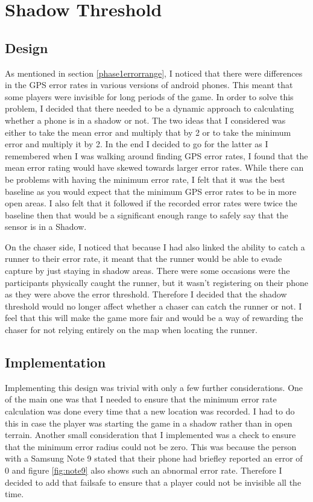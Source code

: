 \documentclass{l4proj}
\begin{document}
\section{Shadow Threshold}

\subsection{Design}
As mentioned in section \ref{phase1errorrange}, I noticed that there were differences in the GPS error rates
in various versions of android phones. This meant that some players were invisible for long periods of the game.
In order to solve this problem, I decided that there needed to be a dynamic approach to calculating whether a
phone is in a shadow or not. The two ideas that I considered was either to take the mean error and multiply that by 2
or to take the minimum error and multiply it by 2. In the end I decided to go for the latter as I remembered when 
I was walking around finding GPS error rates, I found that the mean error rating would have skewed towards larger
error rates. While there can be problems with having the minimum error rate, I felt that it was the best baseline
as you would expect that the minimum GPS error rates to be in more open areas. I also felt that it followed if the
recorded error rates were twice the baseline then that would be a significant enough range to safely say that
the sensor is in a Shadow.

On the chaser side, I noticed that because I had also linked the ability to catch a runner to their error rate, it
meant that the runner would be able to evade capture by just staying in shadow areas. There were some occasions
were the participants physically caught the runner, but it wasn't registering on their phone as they were above the
error threshold. Therefore I decided that the shadow threshold would no longer affect whether a chaser can catch the
runner or not. I feel that this will make the game more fair and would be a way of rewarding the chaser for not
relying entirely on the map when locating the runner.

\subsection{Implementation}
Implementing this design was trivial with only a few further considerations. One of the main one was that I
needed to ensure that the minimum error rate calculation was done every time that a new location was recorded.
I had to do this in case the player was starting the game in a shadow rather than in open terrain. Another
small consideration that I implemented was a check to ensure that the minimum error radius could not be zero.
This was because the person with a Samsung Note 9 stated that their phone had briefley reported an error of 0 
and figure \ref{fig:note9} also shows such an abnormal error rate. Therefore I decided to add that failsafe to
ensure that a player could not be invisible all the time.  
\end{document}
